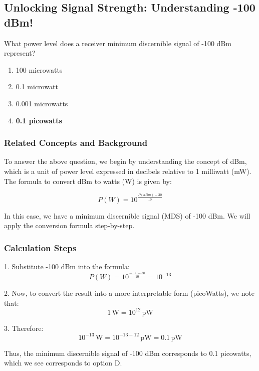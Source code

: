 \subsection{Unlocking Signal Strength: Understanding -100 dBm!}

\begin{tcolorbox}[colback=gray!10, colframe=black, title=E4D14`]
What power level does a receiver minimum discernible signal of -100 dBm represent? 

\begin{enumerate}[label=\Alph*.]
    \item 100 microwatts
    \item 0.1 microwatt
    \item 0.001 microwatts
    \item \textbf{0.1 picowatts}
\end{enumerate} \end{tcolorbox}

\subsubsection{Related Concepts and Background}

To answer the above question, we begin by understanding the concept of dBm, which is a unit of power level expressed in decibels relative to 1 milliwatt (mW). The formula to convert dBm to watts (W) is given by:

\[
P (W) = 10^{\frac{P(dBm) - 30}{10}}
\]

In this case, we have a minimum discernible signal (MDS) of -100 dBm. We will apply the conversion formula step-by-step.

\subsubsection{Calculation Steps}

1. Substitute -100 dBm into the formula:
    \[
    P (W) = 10^{\frac{-100 - 30}{10}} = 10^{-13}
    \]

2. Now, to convert the result into a more interpretable form (picoWatts), we note that:
    \[
    1 \, \text{W} = 10^{12} \, \text{pW}
    \]

3. Therefore:
    \[
    10^{-13} \, \text{W} = 10^{-13 + 12} \, \text{pW} = 0.1 \, \text{pW}
    \]

Thus, the minimum discernible signal of -100 dBm corresponds to 0.1 picowatts, which we see corresponds to option D.

